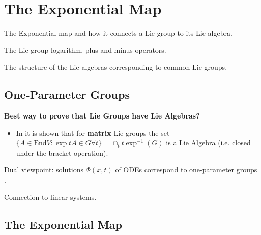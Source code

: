 
\chapter{The Exponential Map}

\begin{itemize_outcomes}
  \item The Exponential map and how it connects a Lie group to its Lie algebra.
  \item The Lie group logarithm,  plus and minus operators.
  \item The structure of the Lie algebras corresponding to common Lie groups.
\end{itemize_outcomes}


\section{One-Parameter Groups}

\textbf{Best way to prove that Lie Groups have Lie Algebras?}
\begin{itemize}
  \item In \cite{howe_very_1983} it is shown that for \textbf{matrix} Lie groups the set $\{ A \in \textrm{End} V : \exp tA \in G \forall t \} = \cap_{t} t \exp^{-1}(G)$ is a Lie Algebra (i.e. closed under the bracket operation).
\end{itemize}

Dual viewpoint: solutions $\Phi(x, t)$ of ODEs correspond to one-parameter groups \cite{howe_very_1983}.

Connection to linear systems.

\section{The Exponential Map}

